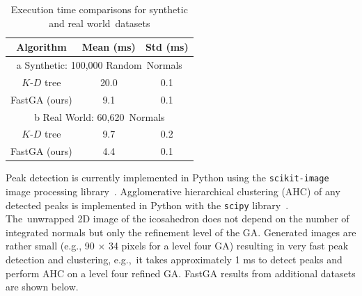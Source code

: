 \begin{table}[H]
    \centering
    \caption{Execution time comparisons for synthetic and real world~datasets} \label{table:ch3_results_fastga}%
   
       
       \begin{tabular}{@{}ccc@{}}
        \toprule
        \textbf{Algorithm} & \textbf{Mean (ms)} & \textbf{Std (ms)} \\ \midrule
        \multicolumn{3}{c}{ a Synthetic: 100,000 Random~Normals} \\ \midrule
        $K$-$D$ tree    & 20.0      & 0.1      \\
        FastGA (ours)  & 9.1       & 0.1      \\ \midrule
     \multicolumn{3}{c}{ b Real World: 60,620~Normals} \\ \midrule
        
        $K$-$D$ tree & 9.7       & 0.2      \\
        FastGA (ours)      & 4.4       & 0.1      \\ \bottomrule
        \end{tabular}
\end{table}

Peak detection is currently implemented in Python using the \texttt{scikit-image} image processing library~\cite{van_der_walt_scikit-image_2014}. Agglomerative hierarchical clustering (AHC) of any detected peaks is implemented in Python with the \texttt{scipy} library~\cite{virtanen_scipy_2020}. The~unwrapped 2D image of the icosahedron does not depend on the number of integrated normals but only the refinement level of the GA. Generated images are rather small (e.g., 90 $\times$ 34 pixels for a level four GA) resulting in very fast peak detection and clustering, e.g.,~it takes approximately 1 ms to detect peaks and perform AHC on a level four refined GA.  FastGA results from additional datasets are shown below. %


